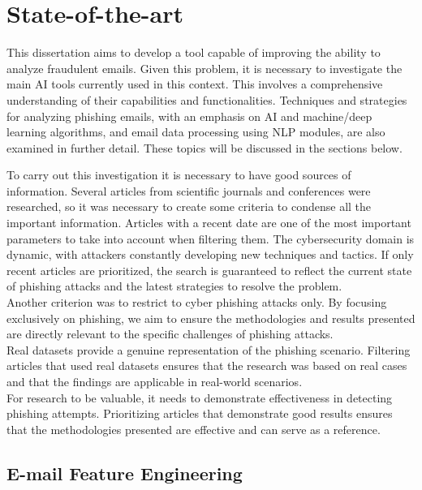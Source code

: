 \chapter{State-of-the-art}
\label{chapter:sota}


This dissertation aims to develop a tool capable of improving the ability to analyze fraudulent emails. Given this problem, it is necessary to investigate the main AI tools currently used in this context. This involves a comprehensive understanding of their capabilities and functionalities. Techniques and strategies for analyzing phishing emails, with an emphasis on AI and machine/deep learning algorithms, and email data processing using NLP modules, are also examined in further detail. These topics will be discussed in the sections below.

To carry out this investigation it is necessary to have good sources of information. Several articles from scientific journals and conferences were researched, so it was necessary to create some criteria to condense all the important information.
Articles with a recent date are one of the most important parameters to take into account when filtering them. The cybersecurity domain is dynamic, with attackers constantly developing new techniques and tactics. If only recent articles are prioritized, the search is guaranteed to reflect the current state of phishing attacks and the latest strategies to resolve the problem.\\
Another criterion was to restrict to cyber phishing attacks only. By focusing exclusively on phishing, we aim to ensure the methodologies and results presented are directly relevant to the specific challenges of phishing attacks.\\ 
Real datasets provide a genuine representation of the phishing scenario. Filtering articles that used real datasets ensures that the research was based on real cases and that the findings are applicable in real-world scenarios.\\
For research to be valuable, it needs to demonstrate effectiveness in detecting phishing attempts. Prioritizing articles that demonstrate good results ensures that the methodologies presented are effective and can serve as a reference.

\section{E-mail Feature Engineering}

